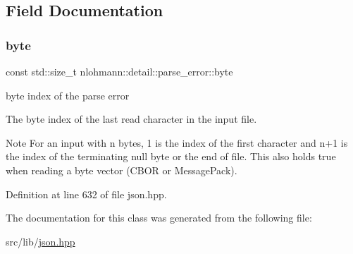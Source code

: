 \subsection{Field Documentation}
\mbox{\label{classnlohmann_1_1detail_1_1parse__error_a9505aaa1ca943be927eec7cc579592ff}} 
\subsubsection{\texorpdfstring{byte}{byte}}
{\footnotesize\ttfamily const std\+::size\+\_\+t nlohmann\+::detail\+::parse\+\_\+error\+::byte}



byte index of the parse error 

The byte index of the last read character in the input file.

\begin{DoxyNote}{Note}
For an input with n bytes, 1 is the index of the first character and n+1 is the index of the terminating null byte or the end of file. This also holds true when reading a byte vector (C\+B\+OR or Message\+Pack). 
\end{DoxyNote}


Definition at line 632 of file json.\+hpp.



The documentation for this class was generated from the following file\+:\begin{DoxyCompactItemize}
\item 
src/lib/\hyperlink{json_8hpp}{json.\+hpp}\end{DoxyCompactItemize}
